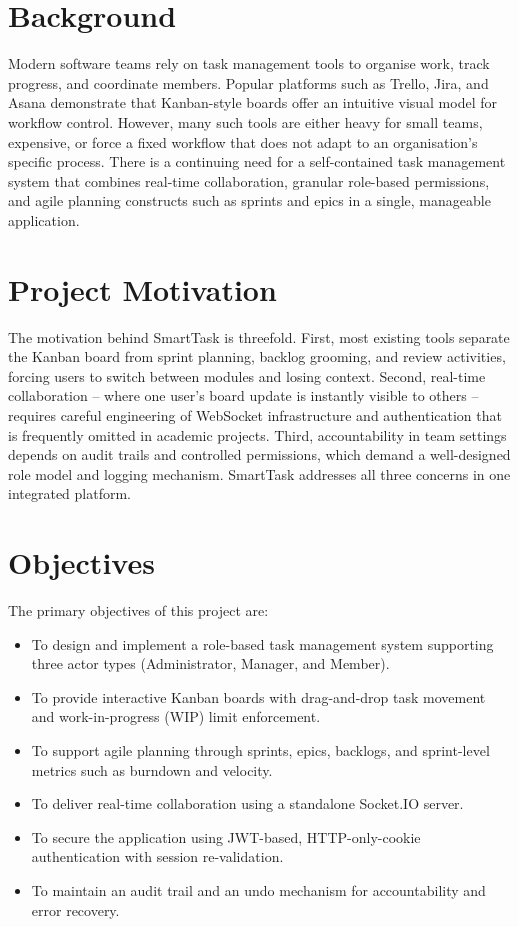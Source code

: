 \documentclass[12pt,a4paper]{report}
\begin{document}
\section{Background}
Modern software teams rely on task management tools to organise work, track
progress, and coordinate members. Popular platforms such as Trello, Jira, and
Asana demonstrate that Kanban-style boards offer an intuitive visual model for
workflow control. However, many such tools are either heavy for small teams,
expensive, or force a fixed workflow that does not adapt to an organisation's
specific process. There is a continuing need for a self-contained task management
system that combines real-time collaboration, granular role-based permissions,
and agile planning constructs such as sprints and epics in a single, manageable
application.

\section{Project Motivation}
The motivation behind SmartTask is threefold. First, most existing tools separate
the Kanban board from sprint planning, backlog grooming, and review activities,
forcing users to switch between modules and losing context. Second, real-time
collaboration -- where one user's board update is instantly visible to others --
requires careful engineering of WebSocket infrastructure and authentication that
is frequently omitted in academic projects. Third, accountability in team settings
depends on audit trails and controlled permissions, which demand a well-designed
role model and logging mechanism. SmartTask addresses all three concerns in one
integrated platform.

\section{Objectives}
The primary objectives of this project are:
\begin{itemize}
  \item To design and implement a role-based task management system supporting
        three actor types (Administrator, Manager, and Member).
  \item To provide interactive Kanban boards with drag-and-drop task movement and
        work-in-progress (WIP) limit enforcement.
  \item To support agile planning through sprints, epics, backlogs, and
        sprint-level metrics such as burndown and velocity.
  \item To deliver real-time collaboration using a standalone Socket.IO server.
  \item To secure the application using JWT-based, HTTP-only-cookie authentication
        with session re-validation.
  \item To maintain an audit trail and an undo mechanism for accountability and
        error recovery.
\end{itemize}
\end{document}

